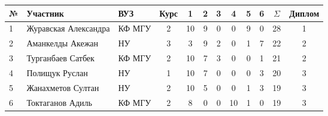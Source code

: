 \begin{center}
\begin{tabular}{|l|l|l|c|c|c|c|c|c|c|c|c|}
\hline
№ & Участник & ВУЗ & Курс & 1 & 2 & 3 & 4 & 5 & 6 & $\Sigma$ & Диплом \\
\hline
1 & Журавская Александра & КФ МГУ & 2 & 10 & 9 & 0 & 0 & 9 & 0 & 28 & 1 \\
\hline
2 & Аманкелды Акежан & НУ & 3 & 3 & 9 & 2 & 0 & 1 & 7 & 22 & 2 \\
\hline
3 & Турганбаев Сатбек & КФ МГУ & 2 & 10 & 7 & 3 & 0 & 0 & 1 & 21 & 2 \\
\hline
4 & Полищук Руслан & НУ & 1 & 10 & 7 & 0 & 0 & 0 & 3 & 20 & 3 \\
\hline
5 & Жанахметов Султан & НУ & 2 & 10 & 5 & 0 & 0 & 1 & 3 & 19 & 3 \\
\hline
6 & Токтаганов Адиль & КФ МГУ & 2 & 8 & 0 & 0 & 10 & 1 & 0 & 19 & 3 \\
\hline
\end{tabular}
\end{center}